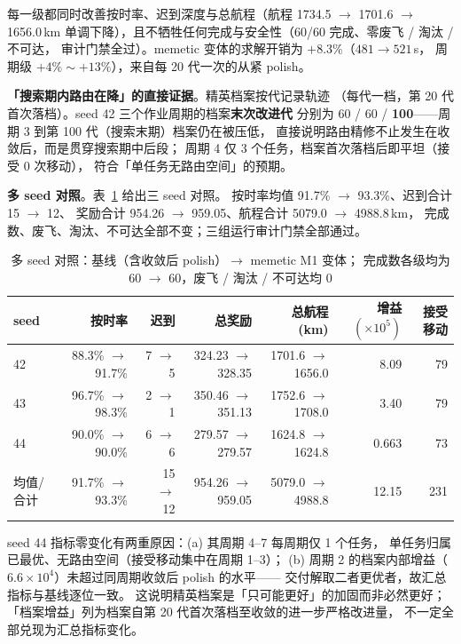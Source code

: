\documentclass[a4paper,11pt]{article}
\begin{document}
每一级都同时改善按时率、迟到深度与总航程（航程 1734.5 $\to$ 1701.6 $\to$ 1656.0\,km
单调下降），且不牺牲任何完成与安全性（60/60 完成、零废飞 / 淘汰 / 不可达，
审计门禁全过）。memetic 变体的求解开销为 $+8.3\%$（$481\to521$\,s，
周期级 $+4\%\sim+13\%$），来自每 20 代一次的从紧 polish。

\textbf{「搜索期内路由在降」的直接证据}。精英档案按代记录轨迹
（每代一档，第 20 代首次落档）。seed 42 三个作业周期的档案\textbf{末次改进代}
分别为 60 / 60 / \textbf{100}——周期 3 到第 100 代（搜索末期）档案仍在被压低，
直接说明路由精修不止发生在收敛后，而是贯穿搜索期中后段；
周期 4 仅 3 个任务，档案首次落档后即平坦（接受 0 次移动），
符合「单任务无路由空间」的预期。

\textbf{多 seed 对照}。表~\ref{tab:memetic} 给出三 seed 对照。
按时率均值 91.7\% $\to$ 93.3\%、迟到合计 15 $\to$ 12、
奖励合计 954.26 $\to$ 959.05、航程合计 5079.0 $\to$ 4988.8\,km，
完成数、废飞、淘汰、不可达全部不变；三组运行审计门禁全部通过。

\begin{table}[H]
\centering
\caption{多 seed 对照：基线（含收敛后 polish）$\to$ memetic M1 变体；
完成数各级均为 60 $\to$ 60，废飞 / 淘汰 / 不可达均 0}
\label{tab:memetic}
\footnotesize
\setlength{\tabcolsep}{4pt}
\begin{tabular}{lrrrrrr}
\toprule
seed & 按时率 & 迟到 & 总奖励 & 总航程(km) & 增益$(\times10^5)$ & 接受移动 \\
\midrule
42 & 88.3\% $\to$ 91.7\% & 7 $\to$ 5 & 324.23 $\to$ 328.35 & 1701.6 $\to$ 1656.0 & 8.09 & 79 \\
43 & 96.7\% $\to$ 98.3\% & 2 $\to$ 1 & 350.46 $\to$ 351.13 & 1752.6 $\to$ 1708.0 & 3.40 & 79 \\
44 & 90.0\% $\to$ 90.0\% & 6 $\to$ 6 & 279.57 $\to$ 279.57 & 1624.8 $\to$ 1624.8 & 0.663 & 73 \\
\midrule
均值/合计 & 91.7\% $\to$ 93.3\% & 15 $\to$ 12 & 954.26 $\to$ 959.05 & 5079.0 $\to$ 4988.8 & 12.15 & 231 \\
\bottomrule
\end{tabular}
\end{table}

seed 44 指标零变化有两重原因：(a) 其周期 4--7 每周期仅 1 个任务，
单任务归属已最优、无路由空间（接受移动集中在周期 1--3）；
(b) 周期 2 的档案内部增益（$6.6\times10^4$）未超过同周期收敛后 polish 的水平——
交付解取二者更优者，故汇总指标与基线逐位一致。
这说明精英档案是「只可能更好」的加固而非必然更好；
「档案增益」列为档案自第 20 代首次落档至收敛的进一步严格改进量，
不一定全部兑现为汇总指标变化。
\end{document}

